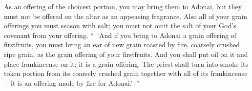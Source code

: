 \begin{biblechapter}
\verse As an offering of the choicest portion, you may bring them to Adonai, but they must not be offered on the altar as an appeasing fragrance.
\verse Also all of your grain offerings you must season with salt; you must not omit the salt of your God’s covenant from your offering.
\verse “ ‘And if you bring to Adonai a grain offering of firstfruits, you must bring an ear of new grain roasted by fire, coarsely crushed ripe grain, as the grain offering of your firstfruits.
\verse And you shall put oil on it and place frankincense on it; it is a grain offering.
\verse The priest shall turn into smoke its token portion from its coarsely crushed grain together with all of its frankincense—it is an offering made by fire for Adonai.’ ”
\end{biblechapter}

